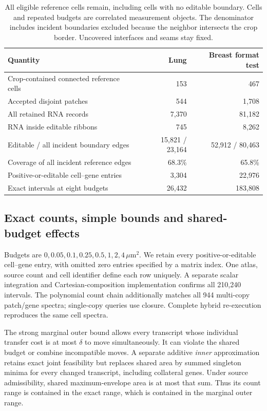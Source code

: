 \documentclass[10pt,letterpaper]{article}
\begin{document}
\begin{table}[t]\centering
\begin{tabular}{lrr}\toprule
Quantity & Lung & Breast format test\\\midrule
Crop-contained connected reference cells &153&467\\
Accepted disjoint patches &544&1,708\\
All retained RNA records &7,370&81,182\\
RNA inside editable ribbons &745&8,262\\
Editable / all incident boundary edges &15,821 / 23,164&52,912 / 80,463\\
Coverage of all incident reference edges &68.3\%&65.8\%\\
Positive-or-editable cell--gene entries &3,304&22,976\\
Exact intervals at eight budgets &26,432&183,808\\\bottomrule
\end{tabular}
\caption{All eligible reference cells remain, including cells with no editable boundary. Cells and repeated budgets are correlated measurement objects. The denominator includes incident boundaries excluded because the neighbor intersects the crop border. Uncovered interfaces and seams stay fixed.}\label{tab:scope}
\end{table}

\subsection{Exact counts, simple bounds and shared-budget effects}
Budgets are $0,0.05,0.1,0.25,0.5,1,2,4\,\mu\mathrm m^2$. We retain every positive-or-editable cell--gene entry, with omitted zero entries specified by a matrix index. One atlas, source count and cell identifier define each row uniquely. A separate scalar integration and Cartesian-composition implementation confirms all 210,240 intervals. The polynomial count chain additionally matches all 944 multi-copy patch/gene spectra; single-copy queries use closure. Complete hybrid re-execution reproduces the same cell spectra.

The strong marginal outer bound allows every transcript whose individual transfer cost is at most $\delta$ to move simultaneously. It can violate the shared budget or combine incompatible moves. A separate additive \emph{inner} approximation retains exact joint feasibility but replaces shared area by summed singleton minima for every changed transcript, including collateral genes. Under source admissibility, shared maximum-envelope area is at most that sum. Thus its count range is contained in the exact range, which is contained in the marginal outer range.
\end{document}
